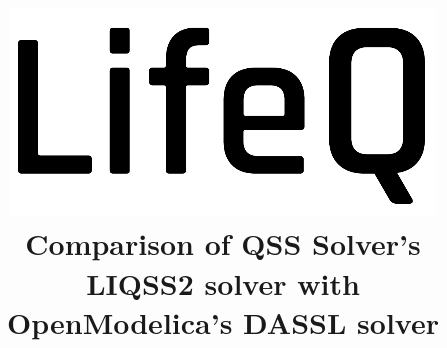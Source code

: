 \documentclass[10pt]{article}
\title{ \hspace{3.2cm}\includegraphics[scale=0.3]{./Fig/1.png} \newline \newline \newline  \LARGE{Comparison of QSS Solver's LIQSS2 solver with OpenModelica's DASSL solver}}
\date{}
\begin{document}
\setcounter{page}{1}



\newcommand{\blokkie}{\hspace{.07cm}\Box\hspace{.07cm}}

\newcommand{\headcol}{\rowcolor{tableheadcolor}}
\newcommand{\rowcol}{\rowcolor{tablerowcolor}}

\newcommand{\topline}{\arrayrulecolor{black}\specialrule{0.1em}{\abovetopsep}{0pt}%
	\arrayrulecolor{tableheadcolor}\specialrule{\belowrulesep}{0pt}{0pt}%
	\arrayrulecolor{black}}

\newcommand{\toplinee}{\arrayrulecolor{black}\specialrule{0.1em}{\abovetopsep}{0pt}%
	\arrayrulecolor{tablerowcolor}\specialrule{\belowrulesep}{0pt}{0pt}%
	\arrayrulecolor{black}}

\newcommand{\midline}{\arrayrulecolor{tableheadcolor}\specialrule{\aboverulesep}{0pt}{0pt}%
	\arrayrulecolor{black}\specialrule{\lightrulewidth}{0pt}{0pt}%
	\arrayrulecolor{white}\specialrule{\belowrulesep}{0pt}{0pt}%
	\arrayrulecolor{black}}

\newcommand{\midlinecbw}{\arrayrulecolor{tablerowcolor}\specialrule{\aboverulesep}{0pt}{0pt}%
	\arrayrulecolor{black}\specialrule{\lightrulewidth}{0pt}{0pt}%
 	\arrayrulecolor{white}\specialrule{\belowrulesep}{0pt}{0pt}%
	\arrayrulecolor{black}}

\newcommand{\midlinecw}{\arrayrulecolor{tablerowcolor}\specialrule{\aboverulesep}{0pt}{0pt}%
	\arrayrulecolor{tablerowcolor}\specialrule{\lightrulewidth}{0pt}{0pt}%
	\arrayrulecolor{white}\specialrule{\belowrulesep}{0pt}{0pt}%
	\arrayrulecolor{black}}

\newcommand{\midlinewbc}{\arrayrulecolor{white}\specialrule{\aboverulesep}{0pt}{0pt}%
	\arrayrulecolor{black}\specialrule{\lightrulewidth}{0pt}{0pt}%
	\arrayrulecolor{tablerowcolor}\specialrule{\belowrulesep}{0pt}{0pt}%
	\arrayrulecolor{black}}

\newcommand{\midlinehr}{\arrayrulecolor{tablerowcolor}\specialrule{\aboverulesep}{0pt}{0pt}%
	\arrayrulecolor{black}\specialrule{\lightrulewidth}{0pt}{0pt}%
	\arrayrulecolor{tableheadcolor}\specialrule{\belowrulesep}{0pt}{0pt}%
	\arrayrulecolor{tablerowcolor}}
\end{document}
